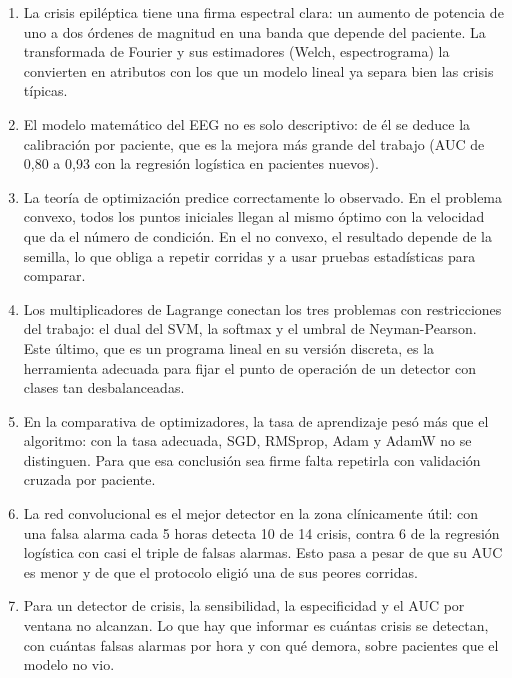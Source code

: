 \begin{enumerate}
  \item La crisis epiléptica tiene una firma espectral clara: un aumento de potencia de uno a dos órdenes de magnitud en una
        banda que depende del paciente. La transformada de Fourier y sus estimadores (Welch, espectrograma) la convierten en
        atributos con los que un modelo lineal ya separa bien las crisis típicas.
  \item El modelo matemático del EEG no es solo descriptivo: de él se deduce la calibración por paciente, que es la mejora más
        grande del trabajo (AUC de 0,80 a 0,93 con la regresión logística en pacientes nuevos).
  \item La teoría de optimización predice correctamente lo observado. En el problema convexo, todos los puntos iniciales
        llegan al mismo óptimo con la velocidad que da el número de condición. En el no convexo, el resultado depende de la
        semilla, lo que obliga a repetir corridas y a usar pruebas estadísticas para comparar.
  \item Los multiplicadores de Lagrange conectan los tres problemas con restricciones del trabajo: el dual del SVM, la softmax
        y el umbral de Neyman-Pearson. Este último, que es un programa lineal en su versión discreta, es la herramienta
        adecuada para fijar el punto de operación de un detector con clases tan desbalanceadas.
  \item En la comparativa de optimizadores, la tasa de aprendizaje pesó más que el algoritmo: con la tasa adecuada, SGD,
        RMSprop, Adam y AdamW no se distinguen. Para que esa conclusión sea firme falta repetirla con validación cruzada por
        paciente.
  \item La red convolucional es el mejor detector en la zona clínicamente útil: con una falsa alarma cada 5 horas detecta 10 de
        14 crisis, contra 6 de la regresión logística con casi el triple de falsas alarmas. Esto pasa a pesar de que su AUC es
        menor y de que el protocolo eligió una de sus peores corridas.
  \item Para un detector de crisis, la sensibilidad, la especificidad y el AUC por ventana no alcanzan. Lo que hay que informar
        es cuántas crisis se detectan, con cuántas falsas alarmas por hora y con qué demora, sobre pacientes que el modelo no
        vio.
\end{enumerate}
